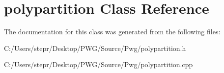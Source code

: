 \hypertarget{classpolypartition}{}\section{polypartition Class Reference}
\label{classpolypartition}


The documentation for this class was generated from the following files\+:\begin{DoxyCompactItemize}
\item 
C\+:/\+Users/stepr/\+Desktop/\+P\+W\+G/\+Source/\+Pwg/polypartition.\+h\item 
C\+:/\+Users/stepr/\+Desktop/\+P\+W\+G/\+Source/\+Pwg/polypartition.\+cpp\end{DoxyCompactItemize}
